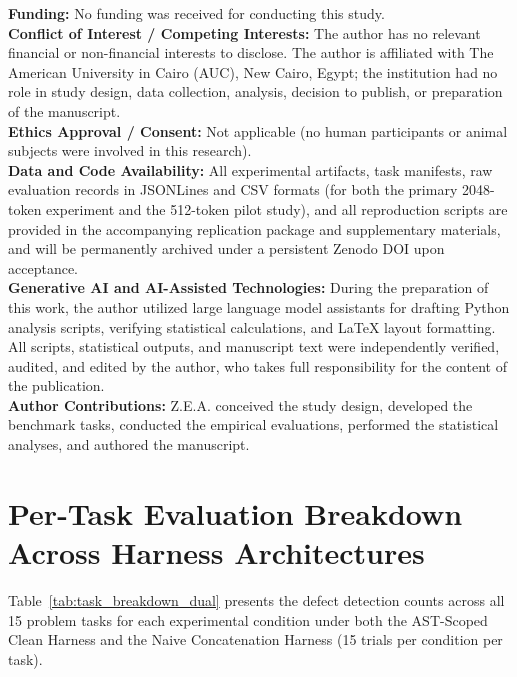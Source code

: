 \documentclass[11pt,a4paper]{article}
\begin{document}
\noindent\textbf{Funding:} No funding was received for conducting this study. \\
\textbf{Conflict of Interest / Competing Interests:} The author has no relevant financial or non-financial interests to disclose. The author is affiliated with The American University in Cairo (AUC), New Cairo, Egypt; the institution had no role in study design, data collection, analysis, decision to publish, or preparation of the manuscript. \\
\textbf{Ethics Approval / Consent:} Not applicable (no human participants or animal subjects were involved in this research). \\
\textbf{Data and Code Availability:} All experimental artifacts, task manifests, raw evaluation records in JSONLines and CSV formats (for both the primary 2048-token experiment and the 512-token pilot study), and all reproduction scripts are provided in the accompanying replication package and supplementary materials, and will be permanently archived under a persistent Zenodo DOI upon acceptance. \\
\textbf{Generative AI and AI-Assisted Technologies:} During the preparation of this work, the author utilized large language model assistants for drafting Python analysis scripts, verifying statistical calculations, and LaTeX layout formatting. All scripts, statistical outputs, and manuscript text were independently verified, audited, and edited by the author, who takes full responsibility for the content of the publication. \\
\textbf{Author Contributions:} Z.E.A. conceived the study design, developed the benchmark tasks, conducted the empirical evaluations, performed the statistical analyses, and authored the manuscript.

\clearpage
\let\oldbibliography\thebibliography
\renewcommand{\thebibliography}[1]{%
  \oldbibliography{#1}%
  \small
  \setlength{\itemsep}{0.2pt}%
  \setlength{\parskip}{0pt}%
}




\appendix
\section{Per-Task Evaluation Breakdown Across Harness Architectures}
\label{sec:appendix_tasks}

Table~\ref{tab:task_breakdown_dual} presents the defect detection counts across all 15 problem tasks for each experimental condition under both the AST-Scoped Clean Harness and the Naive Concatenation Harness (15 trials per condition per task).
\end{document}
